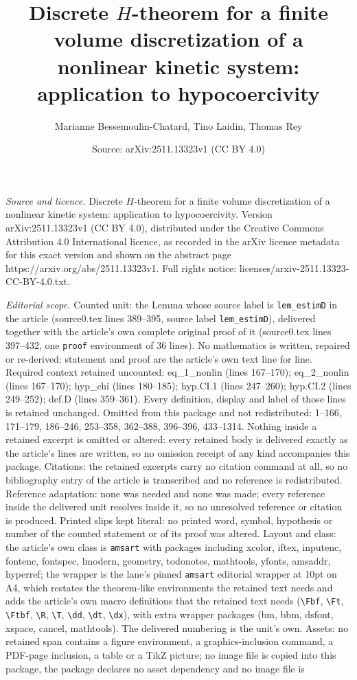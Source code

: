 \documentclass[10pt,a4paper]{amsart}
\title[Discrete $H$-theorem for a finite volume discretization of a]{Discrete $H$-theorem for a finite volume discretization of a nonlinear kinetic system: application to hypocoercivity}
\author{Marianne Bessemoulin-Chatard, Tino Laidin, Thomas Rey}
\date{Source: arXiv:2511.13323v1 (CC BY 4.0)}
\begin{document}
\maketitle

\noindent\emph{Source and licence.} Discrete $H$-theorem for a finite volume discretization of a nonlinear kinetic system: application to hypocoercivity. Version arXiv:2511.13323v1 (CC BY 4.0), distributed under the Creative Commons Attribution 4.0 International licence, as recorded in the arXiv licence metadata for this exact version and shown on the abstract page https://arxiv.org/abs/2511.13323v1. Full rights notice: licenses/arxiv-2511.13323-CC-BY-4.0.txt.\par\smallskip

\noindent\textit{Editorial scope.} Counted unit: the Lemma whose source label is \texttt{lem\_estimD} in the article (source0.tex lines 389--395, source label \texttt{lem\_estimD}), delivered together with the article's own complete original proof of it (source0.tex lines 397--432, one \texttt{proof} environment of 36 lines). No mathematics is written, repaired or re-derived: statement and proof are the article's own text line for line. Required context retained uncounted: eq\_1\_nonlin (lines 167--170); eq\_2\_nonlin (lines 167--170); hyp\_chi (lines 180--185); hyp.CI.1 (lines 247--260); hyp.CI.2 (lines 249--252); def.D (lines 359--361). Every definition, display and label of those lines is retained unchanged. Omitted from this package and not redistributed: 1--166, 171--179, 186--246, 253--358, 362--388, 396--396, 433--1314. Nothing inside a retained excerpt is omitted or altered: every retained body is delivered exactly as the article's lines are written, so no omission receipt of any kind accompanies this package. Citations: the retained excerpts carry no citation command at all, so no bibliography entry of the article is transcribed and no reference is redistributed. Reference adaptation: none was needed and none was made; every reference inside the delivered unit resolves inside it, so no unresolved reference or citation is produced. Printed slips kept literal: no printed word, symbol, hypothesis or number of the counted statement or of its proof was altered. Layout and class: the article's own class is \texttt{amsart} with packages including xcolor, iftex, inputenc, fontenc, fontspec, lmodern, geometry, todonotes, mathtools, yfonts, amsaddr, hyperref; the wrapper is the lane's pinned \texttt{amsart} editorial wrapper at 10pt on A4, which restates the theorem-like environments the retained text needs and adds the article's own macro definitions that the retained text needs (\texttt{\textbackslash Fbf}, \texttt{\textbackslash Ft}, \texttt{\textbackslash Ftbf}, \texttt{\textbackslash R}, \texttt{\textbackslash T}, \texttt{\textbackslash dd}, \texttt{\textbackslash dt}, \texttt{\textbackslash dx}), with extra wrapper packages (bm, bbm, dsfont, xspace, cancel, mathtools). The delivered numbering is the unit's own. Assets: no retained span contains a figure environment, a graphics-inclusion command, a PDF-page inclusion, a table or a TikZ picture; no image file is copied into this package, the package declares no asset dependency and no image file is 
\end{document}
